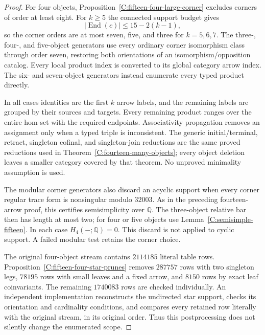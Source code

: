 \begin{proof}
For four objects, Proposition~\ref{C:fifteen-four-large-corner}
excludes corners of order at least eight.  For $k\geq5$ the
connected support budget gives
\[
 |\operatorname{End}(c)|\leq15-2(k-1),
\]
so the corner orders are at most seven, five, and three for
$k=5,6,7$.  The three-, four-, and five-object generators use
every ordinary corner isomorphism class through order seven,
restoring both orientations of an isomorphism/opposition
catalog.  Every local product index is converted to its global
category arrow index.  The six- and seven-object generators
instead enumerate every typed product directly.

In all cases identities are the first $k$ arrow labels, and
the remaining labels are grouped by their sources and targets.
Every remaining product ranges over the entire hom-set with
the required endpoints.  Associativity propagation removes
an assignment only when a typed triple is inconsistent.
The generic initial/terminal, retract, singleton cofinal, and
singleton-join reductions are the same proved reductions used
in Theorem~\ref{C:fourteen-many-objects}; every object deletion
leaves a smaller category covered by that theorem.  No
unproved minimality assumption is used.

The modular corner generators also discard an acyclic support
when every corner regular trace form is nonsingular modulo
$32003$.  As in the preceding fourteen-arrow proof, this
certifies semisimplicity over $\mathbb Q$.  The three-object
relative bar then has length at most two; for four or five
objects use Lemma~\ref{C:semisimple-fifteen}.  In each case
$H_4(-;\mathbb Q)=0$.  This discard is not applied to cyclic
support.  A failed modular test retains the corner choice.

The original four-object stream contains $2114185$ literal
table rows.  Proposition~\ref{C:fifteen-four-star-prunes}
removes $287757$ rows with two singleton legs, $78195$ rows
with small leaves and a fixed arrow, and $8150$ rows by exact
leaf coinvariants.  The remaining $1740083$ rows are checked
individually.  An independent implementation reconstructs
the undirected star support, checks its orientation and
cardinality conditions, and compares every retained row
literally with the original stream, in its original order.
Thus this postprocessing does not silently change the
enumerated scope.


\end{proof}
